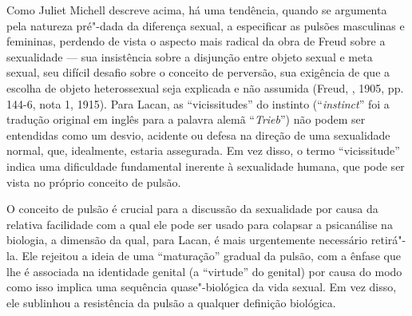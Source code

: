 Como Juliet Michell descreve acima, há uma tendência, quando se
argumenta pela natureza pré"-dada da diferença sexual, a especificar as
pulsões masculinas e femininas, perdendo de vista o aspecto mais radical
da obra de Freud sobre a sexualidade --- sua insistência sobre a
disjunção entre objeto sexual e meta sexual, seu difícil desafio sobre o
conceito de perversão, sua exigência de que a escolha de objeto
heterossexual seja explicada e não assumida (Freud, , 1905, pp.
144-6, nota 1, 1915). Para Lacan, as ``vicissitudes'' do instinto
(``\emph{instinct}'' foi a tradução original em inglês para a palavra
alemã ``\emph{Trieb}'') não podem ser entendidas como um desvio,
acidente ou defesa na direção de uma sexualidade normal, que,
idealmente, estaria assegurada. Em vez disso, o termo ``vicissitude''
indica uma dificuldade fundamental inerente à sexualidade humana, que
pode ser vista no próprio conceito de pulsão.

O conceito de pulsão é crucial para a discussão da sexualidade por causa
da relativa facilidade com a qual ele pode ser usado para colapsar a
psicanálise na biologia, a dimensão da qual, para Lacan, é mais
urgentemente necessário retirá"-la. Ele rejeitou a ideia de uma
``maturação'' gradual da pulsão, com a ênfase que lhe é associada na
identidade genital (a ``virtude'' do genital) por causa do modo como
isso implica uma sequência quase"-biológica da vida sexual. Em vez disso,
ele sublinhou a resistência da pulsão a qualquer definição biológica.

